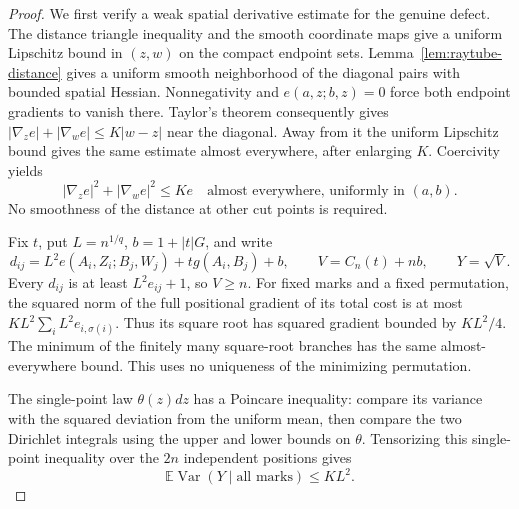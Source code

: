 \documentclass[11pt,reqno]{amsart}
\theoremstyle{definition}
\theoremstyle{remark}
\numberwithin{equation}{section}
\newcommand{\E}{\mathbb E}
\begin{document}
\begin{proof}
We first verify a weak spatial derivative estimate for the genuine
defect. The distance triangle inequality and the smooth coordinate
maps give a uniform Lipschitz bound in \((z,w)\) on the compact
endpoint sets. Lemma~\ref{lem:raytube-distance} gives a uniform
smooth neighborhood of the diagonal pairs with bounded spatial
Hessian. Nonnegativity and \(e(a,z;b,z)=0\) force both endpoint
gradients to vanish there. Taylor's theorem consequently gives
\(|\nabla_z e|+|\nabla_w e|\le K|w-z|\) near the diagonal.
Away from it the uniform Lipschitz bound gives the same estimate
almost everywhere, after enlarging \(K\). Coercivity yields
\begin{equation}
|\nabla_z e|^2+|\nabla_w e|^2\le K e
\quad\text{almost everywhere, uniformly in }(a,b).
\label{eq:highd-defect-gradient}
\end{equation}
No smoothness of the distance at other cut points is required.

Fix \(t\), put \(L=n^{1/q}\), \(b=1+|t|G\), and write
\[
d_{ij}=L^2e(A_i,Z_i;B_j,W_j)+t g(A_i,B_j)+b,
\qquad V=C_n(t)+nb,\qquad Y=\sqrt V.
\]
Every \(d_{ij}\) is at least \(L^2e_{ij}+1\), so \(V\ge n\).
For fixed marks and a fixed permutation, the squared norm of the
full positional gradient of its total cost is at most
\(KL^2\sum_i L^2e_{i,\sigma(i)}\). Thus its square root has
squared gradient bounded by \(KL^2/4\). The minimum of the
finitely many square-root branches has the same almost-everywhere
bound. This uses no uniqueness of the minimizing permutation.

The single-point law \(\theta(z)dz\) has a Poincare inequality:
compare its variance with the squared deviation from the uniform
mean, then compare the two Dirichlet integrals using the upper and
lower bounds on \(\theta\). Tensorizing this single-point
inequality over the \(2n\) independent positions gives
\begin{equation}
\E\operatorname{Var}(Y\mid\text{all marks})\le K L^2.
\label{eq:highd-positional-variance}
\end{equation}


\end{proof}
\end{document}
